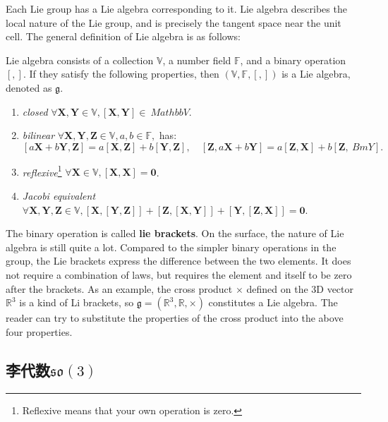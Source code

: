    
        Each Lie group has a Lie algebra corresponding to it. Lie algebra describes the local nature of the Lie group, and is precisely the tangent space near the unit cell. The general definition of Lie algebra is as follows:

        Lie algebra consists of a collection $\mathbb{V}$, a number field $\mathbb{F}$, and a binary operation $[,]$. If they satisfy the following properties, then $(\mathbb{V}, \mathbb{F}, [,])$ is a Lie algebra, denoted as $\mathfrak{g}$.

        \begin{enumerate}
        \item{ \emph{closed} } \quad $\forall \bm{X}, \bm{Y} \in \mathbb{V}, [\bm{X}, \bm{Y}] \in \ Mathbb{V}$.
        \item{ \emph{bilinear} } \quad $\forall \bm{X},\bm{Y},\bm{Z} \in \mathbb{V}, a,b \in \mathbb{F }, $ has:
        \[
          [a\bm{X}+b\bm{Y}, \bm{Z}] = a[\bm{X}, \bm{Z}] + b [ \bm{Y}, \bm{Z} ], \quad [\bm{Z}, a \bm{X}+b\bm{Y}] = a [\bm{Z}, \bm{X} ]+ b [\bm{Z},\ Bm{Y}] .
          \]
          \item{ \emph{reflexive}}\footnote{ Reflexive means that your own operation is zero. } \quad $\forall \bm{X} \in \mathbb{V}, [\bm{X},\bm{X}] = \bm{0}$.
          \item { \emph{Jacobi equivalent} } \quad $\forall \bm{X},\bm{Y},\bm{Z} \in \mathbb{V}, [\bm{X}, [ \bm{Y},\bm{Z}] ] + [\bm{Z}, [\bm{X},\bm{Y}] ] + [\bm{Y}, [\bm{Z}, \bm{X}]] =\bm{0}$.
          \end{enumerate}
          The binary operation is called \textbf{lie brackets}. On the surface, the nature of Lie algebra is still quite a lot. Compared to the simpler binary operations in the group, the Lie brackets express the difference between the two elements. It does not require a combination of laws, but requires the element and itself to be zero after the brackets. As an example, the cross product $\times$ defined on the 3D vector $\mathbb{R}^3$ is a kind of Li brackets, so $\mathfrak{g} = (\mathbb{R}^3, \mathbb{R }, \times)$ constitutes a Lie algebra. The reader can try to substitute the properties of the cross product into the above four properties.

   \subsection{李代数$\mathfrak{so}(3)$}
   
